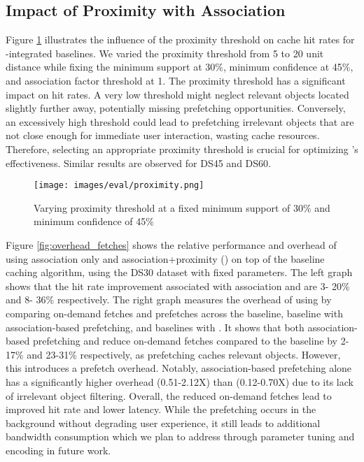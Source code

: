     \subsection{Impact of Proximity with Association}
            Figure \ref{fig:proximity} illustrates the influence of the proximity threshold on cache hit rates for \spaarc{}-integrated baselines. We varied the proximity threshold from 5 to 20 unit distance while fixing the minimum support at 30\%, minimum confidence at 45\%, and association factor threshold at 1. The proximity threshold has a significant impact on hit rates. A very low threshold might neglect relevant objects located slightly further away, potentially missing prefetching opportunities. Conversely, an excessively high threshold could lead to prefetching irrelevant objects that are not close enough for immediate user interaction, wasting cache resources. Therefore, selecting an appropriate proximity threshold is crucial for optimizing \spaarc{}'s effectiveness. Similar results are observed for DS45 and DS60.
                \begin{figure}[h]
                    \centering
                    \texttt{[image: images/eval/proximity.png]}
                    \caption{Varying proximity threshold at a fixed minimum support of 30\% and minimum confidence of 45\%}
                    \label{fig:proximity}
                \end{figure}
    
        Figure \ref{fig:overhead_fetches} %
        shows the relative performance and overhead of using association only  and association+proximity (\spaarc) on top of the baseline caching algorithm, using the DS30 dataset with fixed parameters.
        The left graph shows that the hit rate improvement associated with association and \spaarc{} are 3- 20\% and 8- 36\% respectively. 
        The right graph measures the overhead of using \spaarc{} by comparing on-demand fetches and prefetches across the baseline, baseline with association-based prefetching, and baselines with \spaarc{}. 
        It shows that both association-based prefetching and \spaarc{} reduce on-demand fetches compared to the baseline by 2-17\% and 23-31\% respectively, as prefetching caches relevant objects. However, this introduces a prefetch overhead. Notably, association-based prefetching alone has a significantly higher overhead (0.51-2.12X) than \spaarc{} (0.12-0.70X) due to its lack of irrelevant object filtering. 
        Overall, the reduced on-demand fetches lead to improved hit rate and lower latency. While the prefetching occurs in the background without degrading user experience, it still leads to additional bandwidth consumption %
        which we plan to address through parameter tuning and encoding in future work.

